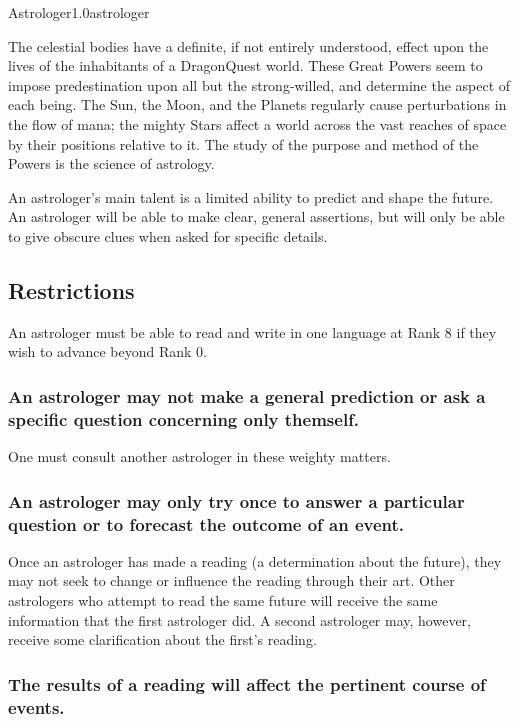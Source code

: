 \begin{skill}{Astrologer}{1.0}{astrologer}

The celestial bodies have a definite, if not entirely understood,
effect upon the lives of the inhabitants of a DragonQuest world.
These Great Powers seem to impose predestination upon all but the
strong-willed, and determine the aspect of each being.  The Sun, the
Moon, and the Planets regularly cause perturbations in the flow of
mana; the mighty Stars affect a world across the vast reaches of space
by their positions relative to it.  The study of the purpose and
method of the Powers is the science of astrology.

An astrologer's main talent is a limited ability to predict and shape
the future.  An astrologer will be able to make clear, general
assertions, but will only be able to give obscure clues when asked for
specific details.

\subsection{Restrictions}

An astrologer must be able to read and write in one language at Rank 8
if they wish to advance beyond Rank 0.

\subsubsection{An astrologer may not make a general prediction or ask a
specific question concerning only themself.}

One must consult another astrologer in these weighty matters.

\subsubsection{An astrologer may only try once to answer a particular
question or to forecast the outcome of an event.}

Once an astrologer has made a reading (\ie a determination about the
future), they may not seek to change or influence the reading through
their art. Other astrologers who attempt to read the same future will
receive the same information that the first astrologer did.  A second
astrologer may, however, receive some clarification about the first's
reading.

\subsubsection{The results of a reading will affect the pertinent course
of events.}


\end{skill}
